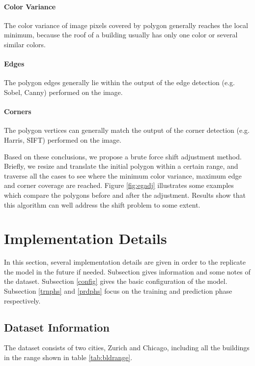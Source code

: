 

\paragraph{Color Variance}
The color variance of image pixels covered by polygon generally reaches the local minimum, because the roof of a building usually has only one color or several similar colors.

\paragraph{Edges}
The polygon edges generally lie within the output of the edge detection (e.g. Sobel, Canny) performed on the image.

\paragraph{Corners}
The polygon vertices can generally match the output of the corner detection (e.g. Harris, SIFT) performed on the image.

Based on these conclusions, we propose a brute force shift adjustment method. Briefly, we resize and translate the initial polygon within a certain range, and traverse all the cases to see where the minimum color variance, maximum edge and corner coverage are reached. Figure \ref{fig:egadj} illustrates some examples which compare the polygons before and after the adjustment. Results show that this algorithm can well address the shift problem to some extent.

\section{Implementation Details}\label{impdet}

In this section, several implementation details are given in order to the replicate the model in the future if needed. Subsection \label{datainfo} gives information and some notes of the dataset. Subsection \ref{config} gives the basic configuration of the model. Subsection \ref{trnphs} and \ref{prdphs} focus on the training and prediction phase respectively.

\subsection{Dataset Information}\label{datainfo}

The dataset consists of two cities, Zurich and Chicago, including all the buildings in the range shown in table \ref{tab:bldrange}.

